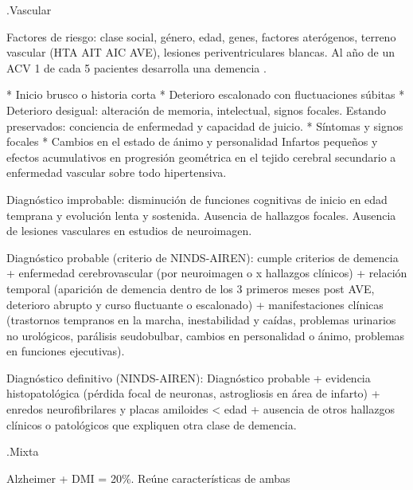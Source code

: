 .Vascular

Factores de riesgo: clase social, género, edad, genes, factores aterógenos, terreno vascular (HTA AIT AIC AVE), lesiones periventriculares blancas. Al año de un ACV 1 de cada 5 pacientes desarrolla una demencia \cite{craig2022prevalence}.

* Inicio brusco o historia corta
* Deterioro escalonado con fluctuaciones súbitas
* Deterioro desigual: alteración de memoria, intelectual, signos focales. Estando preservados: conciencia de enfermedad y capacidad de juicio.
* Síntomas y signos focales
* Cambios en el estado de ánimo y personalidad Infartos pequeños y efectos acumulativos en progresión geométrica en el tejido cerebral secundario a enfermedad vascular sobre todo hipertensiva.

Diagnóstico improbable: disminución de funciones cognitivas de inicio en edad temprana y evolución lenta y sostenida. Ausencia de hallazgos focales. Ausencia de lesiones vasculares en estudios de neuroimagen.

Diagnóstico probable (criterio de NINDS-AIREN): cumple criterios de demencia + enfermedad cerebrovascular (por neuroimagen o x hallazgos clínicos) + relación temporal (aparición de demencia dentro de los 3 primeros meses post AVE, deterioro abrupto y curso fluctuante o escalonado) + manifestaciones clínicas (trastornos tempranos en la marcha, inestabilidad y caídas, problemas urinarios no urológicos, parálisis seudobulbar, cambios en personalidad o ánimo, problemas en funciones ejecutivas).

Diagnóstico definitivo (NINDS-AIREN): Diagnóstico probable + evidencia histopatológica (pérdida focal de neuronas, astrogliosis en área de infarto) + enredos neurofibrilares y placas amiloides < edad + ausencia de otros hallazgos clínicos o patológicos que expliquen otra clase de demencia.

.Mixta

Alzheimer + DMI = 20\%. Reúne características de ambas


